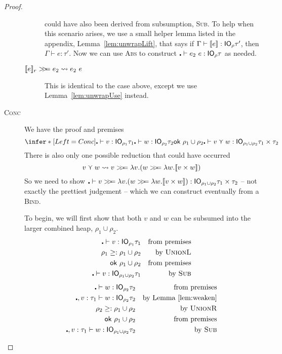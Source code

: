 \begin{proof}
\begin{description}
\begin{description}
      could have also been derived from subsumption, \textsc{Sub}. To
      help when this scenario arises, we use a small helper lemma
      listed in the appendix, Lemma~\ref{lem:unwrapLift}, that says if
      $\Gamma \vdash [\![ e]\!] : \mathsf{IO}_\rho \tau'$, then
      $\Gamma \vdash e : \tau'$. Now we can use \textsc{Abs} to construct
      ${\centerdot \vdash e_2 \ e : \mathsf{IO}_\rho \tau}$ as needed.
    \item[$\use{r}{e} \bind e_2 \leadsto e_2 \ e$] This is identical to the
      case above, except we use Lemma~\ref{lem:unwrapUse} instead.
    \end{description}
  \item[\rm\textsc{Conc}] We have the proof and premises
    \[ \infer*[Left=Conc]{\centerdot \vdash v : \IO_{\rho_1} \tau_1 \\ \centerdot \vdash w : \IO_{\rho_2} \tau_2 \\
      \textsf{ok} \ \rho_1 \cup \rho_2}
      { \centerdot \vdash v \curlyvee w : \IO_{\rho_1 \cup \rho_2} \tau_1 \times \tau_2 } \]
    There is also only one possible reduction that could have
    occurred
    \[ v \curlyvee w \leadsto v \bind \lambda v . (w \bind \lambda w . \lift{v \times w}) \]
    So we need to show ${\centerdot \vdash v \bind \lambda v . (w \bind \lambda w . \lift{v
        \times w}) : \IO_{\rho_1 \cup \rho_2} \tau_1 \times \tau_2}$ -- not exactly the
    prettiest judgement -- which we can construct eventually from a \textsc{Bind}.

    To begin, we will first show that both $v$ and $w$ can be subsumed
    into the larger combined heap, $\rho_1 \cup \rho_2$.
    \begin{align*}
      \centerdot \vdash v : \mathsf{IO}_{\rho_1} \tau_1 && \text{from premises} \\
      \rho_1 \geq: \rho_1 \cup \rho_2 && \text{by \textsc{UnionL}} \\
      \textsf{ok} \ \rho_1 \cup \rho_2 && \text{from premises} \\
      \centerdot \vdash v : \mathsf{IO}_{\rho_1 \cup \rho_2} \tau_1 && \text{by \textsc{Sub}}
    \end{align*}
    \begin{align*}
      \centerdot \vdash w : \mathsf{IO}_{\rho_2} \tau_2 && \text{from premises} \\
      \centerdot , v : \tau_1 \vdash w : \mathsf{IO}_{\rho_2} \tau_2 && \text{by Lemma~\ref{lem:weaken}} \\
      \rho_2 \geq: \rho_1 \cup \rho_2 && \text{by \textsc{UnionR}} \\
      \textsf{ok} \ \rho_1 \cup \rho_2 && \text{from premises} \\
      \centerdot , v : \tau_1 \vdash w : \mathsf{IO}_{\rho_1 \cup \rho_2} \tau_2 && \text{by \textsc{Sub}}
    \end{align*}


\end{description}
\end{proof}
